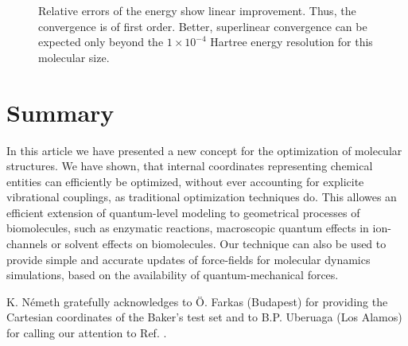 \documentclass[prl,aps,twocolumn,showpacs,twocolumngrid,superbib]{revtex4}
\begin{document}
\begin{figure}[h]
\caption{
\small  
Relative errors of the energy show linear improvement.
Thus, the convergence is of first order. Better, superlinear
convergence can be expected only beyond the $1\times10^{-4}$ Hartree
energy resolution for this molecular size.
\label{order-of-conv}
}
\end{figure}

\section{Summary}
In this article we have presented a new concept
for the optimization of molecular structures.
We have shown, that internal coordinates representing chemical 
entities can efficiently be optimized, without
ever accounting for explicite vibrational couplings, as traditional
optimization techniques do. This allowes an efficient
extension of quantum-level modeling to geometrical processes
of biomolecules, such as enzymatic reactions, macroscopic quantum 
effects in ion-channels or solvent effects on biomolecules.
Our technique can also be used
to provide simple and accurate updates of force-fields
for molecular dynamics simulations, based on the availability of
quantum-mechanical forces.

\begin{acknowledgments}
K. N{\'e}meth gratefully acknowledges to 
{\"{O}}. Farkas (Budapest) for 
providing the Cartesian coordinates of the Baker's test set and to
B.P. Uberuaga (Los Alamos) for calling our attention to Ref. 
\cite{force-matching}.
\end{acknowledgments}


\end{document}
